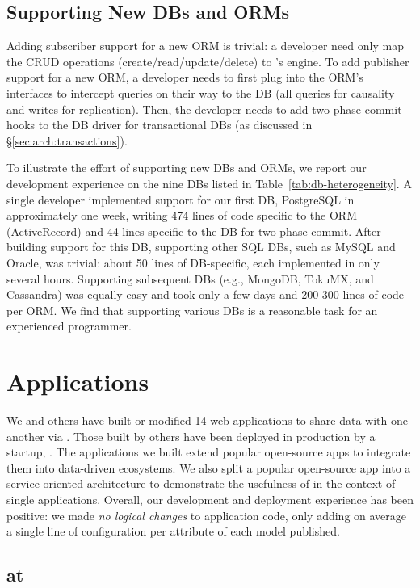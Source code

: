 \subsection{Supporting New DBs and ORMs}
Adding subscriber support for a new ORM is trivial: a developer need only map the CRUD operations (create/read/update/delete) to \synapse's engine.
To add publisher support for a new ORM, a developer needs to first plug into the ORM's interfaces to intercept queries on their way to the DB (all queries for causality and writes for replication).
Then, the developer needs to add two phase commit hooks to the DB driver for transactional DBs (as discussed in \S\ref{sec:arch:transactions}).

To illustrate the effort of supporting new DBs and ORMs, we report our development experience on the nine DBs listed in Table~\ref{tab:db-heterogeneity}.
A single developer implemented support for our first DB, PostgreSQL in approximately one week, writing 474 lines of code specific to the ORM (ActiveRecord) and 44 lines specific to the DB for two phase commit.
After building support for this DB, supporting other SQL DBs, such as MySQL and Oracle, was trivial: about 50 lines of DB-specific, each implemented in only several hours.
Supporting subsequent DBs (e.g., MongoDB, TokuMX, and Cassandra) was equally easy and took only a few days and 200-300 lines of code per ORM.
We find that supporting various DBs is a reasonable task for an experienced programmer.
\section{Applications}
\label{sec:apps}

We and others have built or modified 14 web applications to share data with
one another via \synapse.  Those built by others have been
deployed in production by a startup, \crowdtap.  The applications we built
extend popular open-source apps to integrate them into data-driven ecosystems. 
We also split a popular open-source app into a service oriented architecture
to demonstrate the usefulness of \synapse in the context of single applications.
Overall, our development and deployment experience has been positive: we made
{\em no logical changes} to application code, only adding on
average a single line of configuration per attribute of each model published.


\subsection{\synapse at \crowdtap}
\label{sec:apps:crowdtap}

